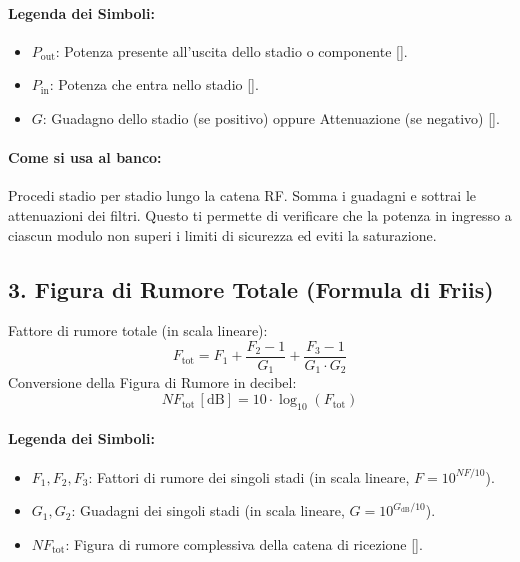 \documentclass[openany,a4paper,12pt]{book}
\begin{document}
\paragraph{Legenda dei Simboli:}
\begin{itemize}
    \item $P_{\text{out}}$: Potenza presente all'uscita dello stadio o componente [].
    \item $P_{\text{in}}$: Potenza che entra nello stadio [].
    \item $G$: Guadagno dello stadio (se positivo) oppure Attenuazione (se negativo) [].
\end{itemize}

\paragraph{Come si usa al banco:}
Procedi stadio per stadio lungo la catena RF. Somma i guadagni e sottrai le attenuazioni dei filtri. Questo ti permette di verificare che la potenza in ingresso a ciascun modulo non superi i limiti di sicurezza ed eviti la saturazione.

\subsection{3. Figura di Rumore Totale (Formula di Friis)}

\begin{tcolorbox}[title=Formula della Figura di Rumore]
Fattore di rumore totale (in scala lineare):
\[
F_{\text{tot}} = F_1 + \frac{F_2 - 1}{G_1} + \frac{F_3 - 1}{G_1 \cdot G_2}
\]
Conversione della Figura di Rumore in decibel:
\[
NF_{\text{tot}} \, [\text{dB}] = 10 \cdot \log_{10}(F_{\text{tot}})
\]
\end{tcolorbox}

\paragraph{Legenda dei Simboli:}
\begin{itemize}
    \item $F_1, F_2, F_3$: Fattori di rumore dei singoli stadi (in scala lineare, $F = 10^{NF/10}$).
    \item $G_1, G_2$: Guadagni dei singoli stadi (in scala lineare, $G = 10^{G_{\text{dB}}/10}$).
    \item $NF_{\text{tot}}$: Figura di rumore complessiva della catena di ricezione [].
\end{itemize}
\end{document}
